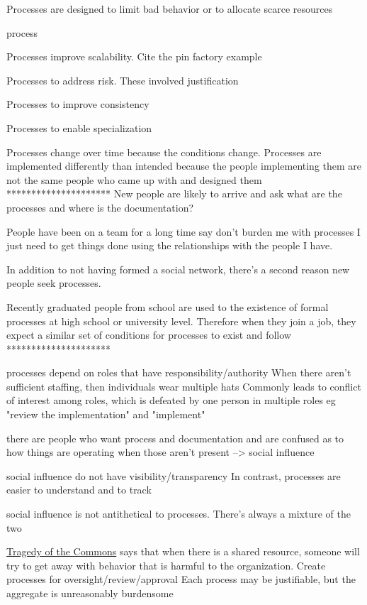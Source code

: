Processes are designed to limit bad behavior or to allocate scarce resources


\gls{process}

Processes improve scalability. Cite the pin factory example

Processes to address risk. These involved justification

Processes to improve consistency

Processes to enable specialization

Processes change over time because the conditions change. Processes are implemented differently than intended because the people implementing them are not the same people who came up with and designed them
*********************
New people are likely to arrive and ask what are the processes and where is the documentation?

People have been on a team for a long time say don't burden me with processes I just need to get things done using the relationships with the people I have.


In addition to not having formed a social network, there's a second reason new people seek processes.

Recently graduated people from school are used to the existence of formal processes at high school or university level. Therefore when they join a job, they expect a similar set of conditions for processes to exist and follow
*********************

processes depend on roles that have responsibility/authority
When there aren't sufficient staffing, then individuals wear multiple hats
Commonly leads to conflict of interest among roles, which is defeated by one person in multiple roles
eg "review the implementation" and "implement"

there are people who want process and documentation and are confused as to how things are operating when those aren't present
--> social influence

social influence do not have visibility/transparency
In contrast, processes are easier to understand and to track

social influence is not antithetical to processes. There's always a mixture of the two


\href{https://en.wikipedia.org/wiki/Tragedy_of_the_commons}{Tragedy of the Commons} says that when there is a shared resource, someone will try to get away with behavior that is harmful to the organization.
Create processes for oversight/review/approval
Each process may be justifiable, but the aggregate is unreasonably burdensome


